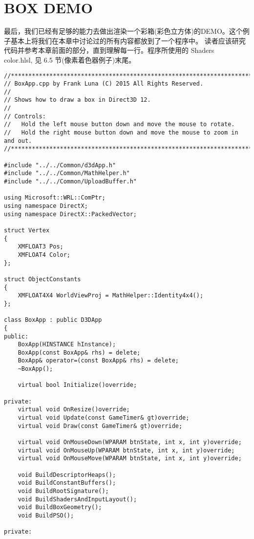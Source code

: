 \section{BOX DEMO}
\begin{flushleft}
最后，我们已经有足够的能力去做出渲染一个彩箱(彩色立方体)的DEMO。这个例子基本上将我们在本章中讨论过的所有内容都放到了一个程序中。 读者应该研究代码并参考本章前面的部分，直到理解每一行。程序所使用的 Shaders\\color.hlsl, 见 6.5 节(像素着色器例子)末尾。
\end{flushleft}
\begin{lstlisting}
//**************************************************************************
// BoxApp.cpp by Frank Luna (C) 2015 All Rights Reserved.
//
// Shows how to draw a box in Direct3D 12.
//
// Controls:
//   Hold the left mouse button down and move the mouse to rotate.
//   Hold the right mouse button down and move the mouse to zoom in and out.
//**************************************************************************

#include "../../Common/d3dApp.h"
#include "../../Common/MathHelper.h"
#include "../../Common/UploadBuffer.h"

using Microsoft::WRL::ComPtr;
using namespace DirectX;
using namespace DirectX::PackedVector;

struct Vertex
{
    XMFLOAT3 Pos;
    XMFLOAT4 Color;
};

struct ObjectConstants
{
    XMFLOAT4X4 WorldViewProj = MathHelper::Identity4x4();
};

class BoxApp : public D3DApp
{
public:
    BoxApp(HINSTANCE hInstance);
    BoxApp(const BoxApp& rhs) = delete;
    BoxApp& operator=(const BoxApp& rhs) = delete;
    ~BoxApp();

    virtual bool Initialize()override;

private:
    virtual void OnResize()override;
    virtual void Update(const GameTimer& gt)override;
    virtual void Draw(const GameTimer& gt)override;

    virtual void OnMouseDown(WPARAM btnState, int x, int y)override;
    virtual void OnMouseUp(WPARAM btnState, int x, int y)override;
    virtual void OnMouseMove(WPARAM btnState, int x, int y)override;

    void BuildDescriptorHeaps();
    void BuildConstantBuffers();
    void BuildRootSignature();
    void BuildShadersAndInputLayout();
    void BuildBoxGeometry();
    void BuildPSO();

private:
    

\end{lstlisting}
